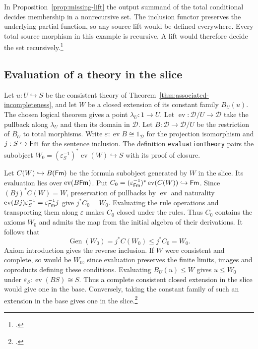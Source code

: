 In Proposition~\ref{prop:missing-lift} the output summand of the total
conditional decides membership in a nonrecursive set. The inclusion
functor preserves the underlying partial function, so any source lift
would be defined everywhere. Every total source morphism in this example
is recursive. A lift would therefore decide the set
recursively.\footnote{.}

\subsection{Evaluation of a theory in the slice}

Let $u:U\hookrightarrow S$ be the consistent theory of
Theorem~\ref{thm:associated-incompleteness}, and let $W$ be a closed
extension of its constant family $B_U(u)$. The chosen logical theorem
gives a point $\lambda_U:1\to U$. Let $\operatorname{ev}:\mathcal D/U\to\mathcal D$
take the pullback along $\lambda_U$ and then its domain in $\mathcal D$.
Let $B:\mathcal D\to\mathcal D/U$ be the restriction of $B_U$ to total morphisms. Write
$\varepsilon:\operatorname{ev}B\cong 1_{\mathcal D}$ for the projection isomorphism and
$j:S\hookrightarrow\mathsf{Fm}$ for the sentence inclusion. The definition
\texttt{evaluationTheory} pairs the subobject
$W_0=(\varepsilon_S^{-1})^*\operatorname{ev}(W)\hookrightarrow S$ with its proof of closure.

Let $C(W)\hookrightarrow B(\mathsf{Fm})$ be the formula subobject generated
by $W$ in the slice. Its evaluation lies over $\operatorname{ev}(B\mathsf{Fm})$. Put
$C_0=(\varepsilon_{\mathsf{Fm}}^{-1})^*\operatorname{ev}(C(W))\hookrightarrow\mathsf{Fm}$.
Since $(Bj)^*C(W)=W$, preservation of pullbacks by $\operatorname{ev}$ and naturality
$\operatorname{ev}(Bj)\varepsilon_S^{-1}=\varepsilon_{\mathsf{Fm}}^{-1}j$ give $j^*C_0=W_0$. Evaluating the rule
operations and transporting them along $\varepsilon$ makes $C_0$ closed under
the rules. Thus $C_0$ contains the axioms $W_0$ and admits the map
from the initial algebra of their derivations. It follows that
\[
 \operatorname{Gen}(W_0)=j^*C(W_0)\le j^*C_0=W_0 .
\]
Axiom introduction gives the reverse inclusion. If $W$ were consistent and complete, so would be $W_0$,
since evaluation preserves the finite limits, images and coproducts
defining these conditions. Evaluating $B_U(u)\leq W$ gives $u\leq W_0$
under $\varepsilon_S:\operatorname{ev}(BS)\cong S$. Thus a complete consistent closed extension in
the slice would give one in the base. Conversely, taking the constant
family of such an extension in the base gives one in the
slice.\footnote{.}

